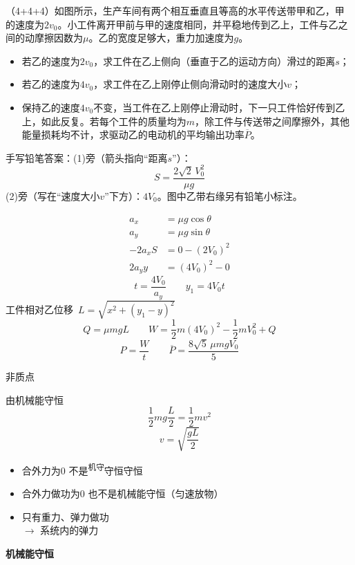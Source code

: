 \begin{problem}[贴纸印刷题]
（4+4+4）如图所示，生产车间有两个相互垂直且等高的水平传送带甲和乙，甲的速度为$2v_0$。小工件离开甲前与甲的速度相同，并平稳地传到乙上，工件与乙之间的动摩擦因数为$\mu$。乙的宽度足够大，重力加速度为$g$。
\begin{itemize}
\item[(1)] 若乙的速度为$2v_0$，求工件在乙上侧向（垂直于乙的运动方向）滑过的距离$s$；
\item[(2)] 若乙的速度为$4v_0$，求工件在乙上刚停止侧向滑动时的速度大小$v$；
\item[(3)] 保持乙的速度$4v_0$不变，当工件在乙上刚停止滑动时，下一只工件恰好传到乙上，如此反复。若每个工件的质量均为$m$，除工件与传送带之间摩擦外，其他能量损耗均不计，求驱动乙的电动机的平均输出功率$\overline{P}$。
\end{itemize}


手写铅笔答案：(1)旁（箭头指向“距离$s$”）：
\[
S=\frac{2\sqrt2\,V_0^2}{\mu g}
\]
(2)旁（写在“速度大小$v$”下方）：$4V_0$。图中乙带右缘另有铅笔小标注。

\begin{solution}
\begin{align*}
a_x&=\mu g\cos\theta\\
a_y&=\mu g\sin\theta\\
-2a_xS&=0-(2V_0)^2\\
2a_yy&=(4V_0)^2-0
\end{align*}
\[
t=\frac{4V_0}{a_y}\qquad y_1=4V_0t
\]
工件相对乙位移\ $L=\sqrt{x^2+(y_1-y)^2}$
\[
Q=\mu mgL\qquad W=\frac{1}{2}m(4V_0)^2-\frac{1}{2}mV_0^2+Q
\] %
\[
P=\frac{W}{t}\qquad \overline{P}=\frac{8\sqrt5\,\mu mgV_0}{5}
\]
\end{solution}
\end{problem}

非质点

由机械能守恒
\[
\frac12 mg\frac L2=\frac12 mv^2
\]
\[
v=\sqrt{\frac{gL}{2}}
\]
\begin{itemize}
\item 合外力为0 不是\textsuperscript{机守}守恒守恒 %
\item 合外力做功为0 也不是机械能守恒\quad（匀速放物） %
\item 只有重力、弹力做功\\
  $\to$ 系统内的弹力
\end{itemize}
\textbf{机械能守恒}

